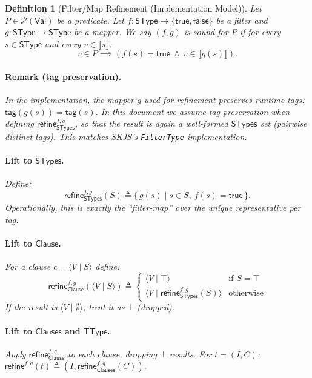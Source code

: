 \documentclass[11pt]{article}
\newtheorem{definition}[theorem]{Definition}
\newcommand{\sem}[1]{\llbracket #1 \rrbracket}
\newcommand{\refineop}{\mathsf{refine}}
\newcommand{\Pred}{\mathcal{P}(\Val)}
\newcommand{\SType}{\mathsf{SType}}
\newcommand{\TType}{\mathsf{TType}}
\newcommand{\Clauses}{\mathsf{Clauses}}
\newcommand{\Clause}{\mathsf{Clause}}
\newcommand{\STypes}{\mathsf{STypes}}
\newcommand{\tagfn}{\mathsf{tag}}
\newcommand{\Val}{\mathsf{Val}}
\newcommand{\clause}[2]{\langle #1 \mid #2 \rangle}
\begin{document}
\begin{definition}[Filter/Map Refinement (Implementation Model)]
\label{def:filter-map-refinement}
Let $P \in \Pred$ be a predicate.
Let $f : \SType \to \{\mathsf{true},\mathsf{false}\}$ be a filter and $g : \SType \to \SType$ be a mapper.
We say $(f,g)$ is \emph{sound for $P$} if for every $s \in \SType$ and every $v \in \sem{s}$:
\[
v \in P \implies (f(s) = \mathsf{true} \ \land\  v \in \sem{g(s)}).
\]
\paragraph{Remark (tag preservation).}
In the implementation, the mapper $g$ used for refinement preserves runtime tags:
$\tagfn(g(s))=\tagfn(s)$.
In this document we assume tag preservation when defining $\refineop_{\STypes}^{f,g}$, so that the result is again a well-formed $\STypes$ set (pairwise distinct tags). This matches SKJS's \texttt{FilterType} implementation.
\paragraph{Lift to $\STypes$.}
Define:
\[
\refineop_{\STypes}^{f,g}(S) \triangleq \{\, g(s) \mid s \in S,\ f(s)=\mathsf{true}\,\}.
\]
Operationally, this is exactly the ``filter-map'' over the unique representative per tag.
\paragraph{Lift to $\Clause$.}
For a clause $c = \clause{V}{S}$ define:
\[
\refineop_{\Clause}^{f,g}(\clause{V}{S}) \triangleq
\begin{cases}
\clause{V}{\top} & \text{if } S = \top \\
\clause{V}{\refineop_{\STypes}^{f,g}(S)} & \text{otherwise}
\end{cases}
\]
If the result is $\clause{V}{\emptyset}$, treat it as $\bot$ (dropped).

\paragraph{Lift to $\Clauses$ and $\TType$.}
Apply $\refineop_{\Clause}^{f,g}$ to each clause, dropping $\bot$ results.
For $t=(I,C)$: $\refineop^{f,g}(t) \triangleq (I,\refineop_{\Clauses}^{f,g}(C))$.
\end{definition}
\end{document}
